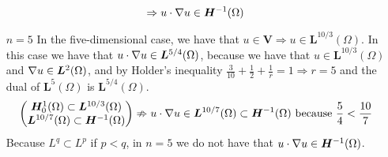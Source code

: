 \begin{itemize}
\[              \Rightarrow u \cdot \nabla u \in \bm{H}^{-1}(\Omega)
          \]
    \item[\(n = 5\)] In the five-dimensional case, we have that \(u \in \bm{V} \Rightarrow u \in \bm{L}^{10/3}(\Omega)\). In this case we have that \(u \cdot \nabla u \in \bm{L}^{5/4}(\Omega)\), because we have that \(u \in \bm{L}^{10/3}(\Omega)\) and \(\nabla u \in \bm{L}^2(\Omega)\), and by Holder's inequality \(\frac{3}{10} + \frac{1}{2} + \frac{1}{r} = 1 \Rightarrow r = 5\) and the dual of \(\bm{L}^{5}(\Omega)\) is \(\bm{L}^{5/4}(\Omega)\).
          \[
              \begin{pmatrix*}
                  \bm{H}^1_0(\Omega) \subset \bm{L}^{10/3}{(\Omega)}  \\
                  \bm{L}^{10/7}(\Omega) \subset \bm{H}^{-1}(\Omega)
              \end{pmatrix*}
              \nRightarrow u \cdot \grad u \in \bm{L}^{10/7}(\Omega) \subset \bm{H}^{-1}(\Omega) \text{ because } \frac{5}{4} < \frac{10}{7}
          \]
          Because \(L^q \subset L^p\) if \(p < q\), in \(n = 5\) we do not have that \(u
          \cdot \nabla u \in \bm{H}^{-1}(\Omega)\).
\end{itemize}

